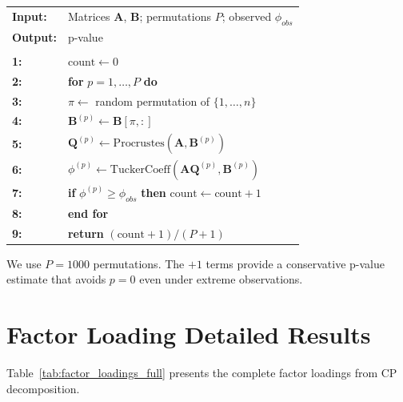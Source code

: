 \documentclass[11pt,twocolumn]{article}
\begin{document}
\begin{tcolorbox}[colback=gray!5,colframe=farzullaburgundy,title={\textbf{Algorithm 3:} Permutation Test for $\phi$}]
\begin{tabular}{@{}ll@{}}
\textbf{Input:} & Matrices $\mathbf{A}$, $\mathbf{B}$; permutations $P$; observed $\phi_{obs}$ \\
\textbf{Output:} & p-value \\
\\
\textbf{1:} & $\text{count} \gets 0$ \\
\textbf{2:} & \textbf{for} $p = 1, \ldots, P$ \textbf{do} \\
\textbf{3:} & \quad $\pi \gets$ random permutation of $\{1, \ldots, n\}$ \\
\textbf{4:} & \quad $\mathbf{B}^{(p)} \gets \mathbf{B}[\pi, :]$ \\
\textbf{5:} & \quad $\mathbf{Q}^{(p)} \gets \text{Procrustes}(\mathbf{A}, \mathbf{B}^{(p)})$ \\
\textbf{6:} & \quad $\phi^{(p)} \gets \text{TuckerCoeff}(\mathbf{A}\mathbf{Q}^{(p)}, \mathbf{B}^{(p)})$ \\
\textbf{7:} & \quad \textbf{if} $\phi^{(p)} \geq \phi_{obs}$ \textbf{then} $\text{count} \gets \text{count} + 1$ \\
\textbf{8:} & \textbf{end for} \\
\textbf{9:} & \textbf{return} $(\text{count} + 1) / (P + 1)$
\end{tabular}
\end{tcolorbox}

We use $P = 1000$ permutations. The $+1$ terms provide a conservative p-value estimate that avoids $p = 0$ even under extreme observations.

\section{Factor Loading Detailed Results}
\label{app:factor_loadings}

Table~\ref{tab:factor_loadings_full} presents the complete factor loadings from CP decomposition.
\end{document}
